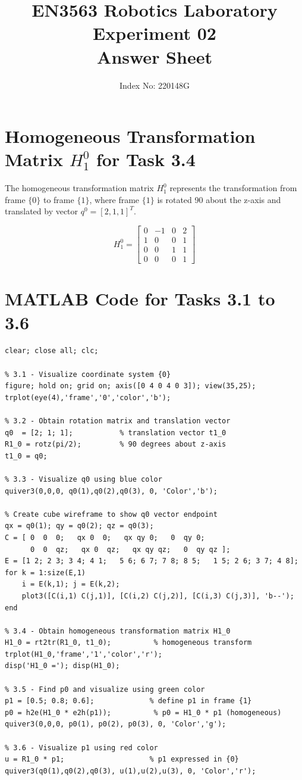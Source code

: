 \documentclass[11pt,a4paper]{article}
\title{EN3563 Robotics Laboratory Experiment 02\\
Answer Sheet}
\author{Index No: 220148G \hspace{3cm}}
\date{}
\begin{document}
\maketitle

\section{Homogeneous Transformation Matrix $H_1^0$ for Task 3.4}

The homogeneous transformation matrix $H_1^0$ represents the transformation from frame $\{0\}$ to frame $\{1\}$, where frame $\{1\}$ is rotated 90\textdegree{} about the z-axis and translated by vector $q^0 = [2, 1, 1]^T$.

$$H_1^0 = \begin{bmatrix}
0 & -1 & 0 & 2 \\
1 & 0 & 0 & 1 \\
0 & 0 & 1 & 1 \\
0 & 0 & 0 & 1
\end{bmatrix}$$

\section{MATLAB Code for Tasks 3.1 to 3.6}

\begin{lstlisting}[style=matlab, caption={MATLAB Code for Tasks 3.1-3.6}]
clear; close all; clc;

% 3.1 - Visualize coordinate system {0}
figure; hold on; grid on; axis([0 4 0 4 0 3]); view(35,25);
trplot(eye(4),'frame','0','color','b');

% 3.2 - Obtain rotation matrix and translation vector
q0  = [2; 1; 1];           % translation vector t1_0
R1_0 = rotz(pi/2);         % 90 degrees about z-axis
t1_0 = q0;

% 3.3 - Visualize q0 using blue color
quiver3(0,0,0, q0(1),q0(2),q0(3), 0, 'Color','b');

% Create cube wireframe to show q0 vector endpoint
qx = q0(1); qy = q0(2); qz = q0(3);
C = [ 0  0  0;   qx 0  0;   qx qy 0;   0  qy 0;   
      0  0  qz;   qx 0  qz;   qx qy qz;   0  qy qz ];
E = [1 2; 2 3; 3 4; 4 1;   5 6; 6 7; 7 8; 8 5;   1 5; 2 6; 3 7; 4 8];
for k = 1:size(E,1)
    i = E(k,1); j = E(k,2);
    plot3([C(i,1) C(j,1)], [C(i,2) C(j,2)], [C(i,3) C(j,3)], 'b--');
end

% 3.4 - Obtain homogeneous transformation matrix H1_0
H1_0 = rt2tr(R1_0, t1_0);          % homogeneous transform
trplot(H1_0,'frame','1','color','r');
disp('H1_0 ='); disp(H1_0);

% 3.5 - Find p0 and visualize using green color
p1 = [0.5; 0.8; 0.6];             % define p1 in frame {1}
p0 = h2e(H1_0 * e2h(p1));          % p0 = H1_0 * p1 (homogeneous)
quiver3(0,0,0, p0(1), p0(2), p0(3), 0, 'Color','g');

% 3.6 - Visualize p1 using red color
u = R1_0 * p1;                    % p1 expressed in {0}
quiver3(q0(1),q0(2),q0(3), u(1),u(2),u(3), 0, 'Color','r');
\end{lstlisting}
\end{document}
